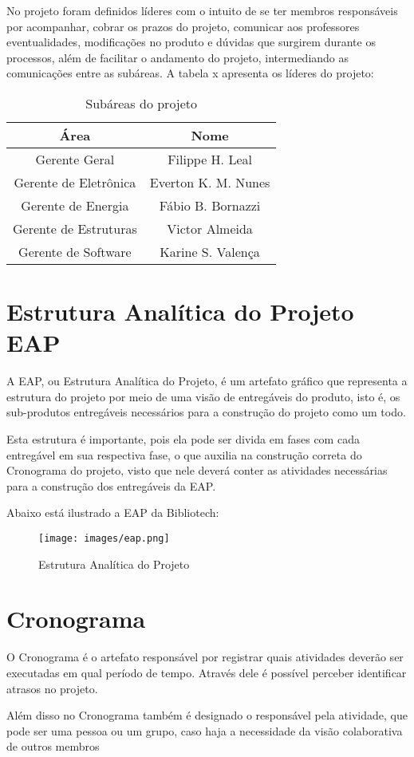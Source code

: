 No projeto foram definidos líderes com o intuito de se ter membros responsáveis por acompanhar, cobrar os prazos do projeto, comunicar aos professores eventualidades, modificações no produto e dúvidas que surgirem durante os processos, além de facilitar o andamento do projeto, intermediando as comunicações entre as subáreas. A tabela x apresenta os líderes do projeto:

\begin{table}[h]
\caption{Subáreas do projeto}
\centering
\begin{tabular}{|c|c|} \hline
\textbf{Área} & \textbf{Nome}\\ \hline                               
Gerente Geral & Filippe H. Leal\\ \hline
Gerente de Eletrônica & Everton K. M. Nunes\\ \hline
Gerente de Energia & Fábio B. Bornazzi\\ \hline
Gerente de Estruturas & Victor Almeida\\ \hline
Gerente de Software & Karine S. Valença\\ \hline
\end{tabular}
\end{table}

\section{Estrutura Analítica do Projeto EAP}
A EAP, ou Estrutura Analítica do Projeto, é um artefato gráfico que representa a estrutura do projeto por meio de uma visão de entregáveis do produto, isto é, os sub-produtos entregáveis necessários para a construção do projeto como um todo.

Esta estrutura é importante, pois ela pode ser divida em fases com cada entregável em sua respectiva fase, o que auxilia na construção correta do Cronograma do projeto, visto que nele deverá conter as atividades necessárias para a construção dos entregáveis da EAP.

Abaixo está ilustrado a EAP da Bibliotech:
\begin{figure}[!htb]
     \centering
     \texttt{[image: images/eap.png]}
     \caption{Estrutura Analítica do Projeto}
     \label{Estrutura Analítica do Projeto}
\end{figure}

\section{Cronograma}
O Cronograma é o artefato responsável por registrar quais atividades deverão ser executadas em qual período de tempo. Através dele é possível perceber identificar atrasos no projeto.

Além disso no Cronograma também é designado o responsável pela atividade, que pode ser uma pessoa ou um grupo, caso haja a necessidade da visão colaborativa de outros membros



